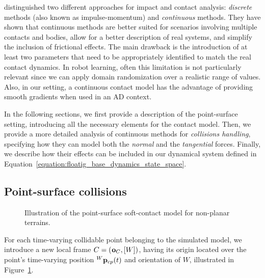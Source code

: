 \textcite{gilardi_literature_2002} distinguished two different approaches for impact and contact analysis: \emph{discrete} methods (also known as impulse-momentum) and \emph{continuous} methods.
They have shown that continuous methods are better suited for scenarios involving multiple contacts and bodies, allow for a better description of real systems, and simplify the inclusion of frictional effects.
The main drawback is the introduction of at least two parameters that need to be appropriately identified to match the real contact dynamics.
In robot learning, often this limitation is not particularly relevant since we can apply domain randomization over a realistic range of values.
Also, in our setting, a continuous contact model has the advantage of providing smooth gradients when used in an \ac{AD} context.

In the following sections, we first provide a description of the point-surface setting, introducing all the necessary elements for the contact model.
Then, we provide a more detailed analysis of continuous methods for \emph{collisions handling}, specifying how they can model both the \emph{normal} and the \emph{tangential} forces.
Finally, we describe how their effects can be included in our dynamical system defined in Equation~\eqref{equation:floatig_base_dynamics_state_space}.

\subsection{Point-surface collisions}
\label{section:point-surface_collisions}

\begin{figure}
    \centering
    \caption{Illustration of the point-surface soft-contact model for non-planar terrains.}
    \label{fig:soft_contact_model}
\end{figure}

For each time-varying collidable point belonging to the simulated model, we introduce a new local frame $C = (\ori_C, [W])$, having its origin located over the point's time-varying position $\pos[W]_{cp}(t)$ and orientation of $W$, illustrated in Figure~\ref{fig:soft_contact_model}.

